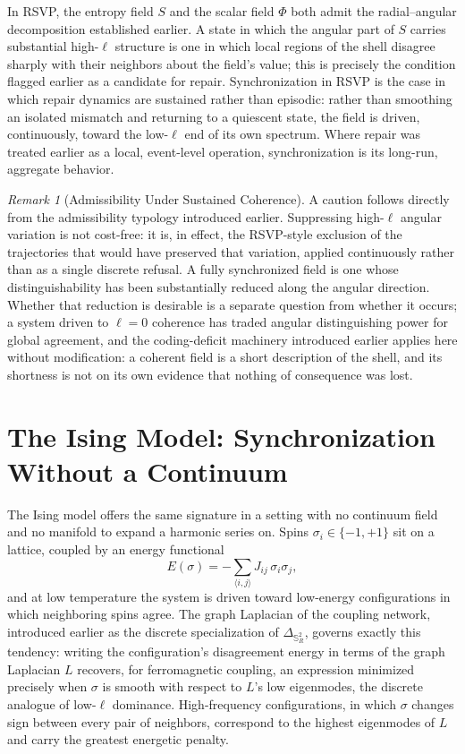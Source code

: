 \documentclass[11pt,fleqn]{book}
\numberwithin{equation}{chapter}
\theoremstyle{plain}
\theoremstyle{definition}
\theoremstyle{remark}
\newtheorem{remark}[theorem]{Remark}
\newcommand{\Sphere}{\mathbb{S}^{2}}
\begin{document}
In RSVP, the entropy field \(S\) and the scalar field \(\Phi\) both admit the radial--angular decomposition established earlier. A state in which the angular part of \(S\) carries substantial high-\(\ell\) structure is one in which local regions of the shell disagree sharply with their neighbors about the field's value; this is precisely the condition flagged earlier as a candidate for repair. Synchronization in RSVP is the case in which repair dynamics are sustained rather than episodic: rather than smoothing an isolated mismatch and returning to a quiescent state, the field is driven, continuously, toward the low-\(\ell\) end of its own spectrum. Where repair was treated earlier as a local, event-level operation, synchronization is its long-run, aggregate behavior.

\begin{remark}[Admissibility Under Sustained Coherence]
A caution follows directly from the admissibility typology introduced earlier. Suppressing high-\(\ell\) angular variation is not cost-free: it is, in effect, the RSVP-style exclusion of the trajectories that would have preserved that variation, applied continuously rather than as a single discrete refusal. A fully synchronized field is one whose distinguishability has been substantially reduced along the angular direction. Whether that reduction is desirable is a separate question from whether it occurs; a system driven to \(\ell=0\) coherence has traded angular distinguishing power for global agreement, and the coding-deficit machinery introduced earlier applies here without modification: a coherent field is a short description of the shell, and its shortness is not on its own evidence that nothing of consequence was lost.
\end{remark}

\section{The Ising Model: Synchronization Without a Continuum}

The Ising model offers the same signature in a setting with no continuum field and no manifold to expand a harmonic series on. Spins \(\sigma_i \in \{-1,+1\}\) sit on a lattice, coupled by an energy functional
\begin{equation}
E(\sigma) = -\sum_{\langle i,j\rangle} J_{ij}\,\sigma_i \sigma_j,
\end{equation}
and at low temperature the system is driven toward low-energy configurations in which neighboring spins agree. The graph Laplacian of the coupling network, introduced earlier as the discrete specialization of \(\Delta_{\Sphere_R}\), governs exactly this tendency: writing the configuration's disagreement energy in terms of the graph Laplacian \(L\) recovers, for ferromagnetic coupling, an expression minimized precisely when \(\sigma\) is smooth with respect to \(L\)'s low eigenmodes, the discrete analogue of low-\(\ell\) dominance. High-frequency configurations, in which \(\sigma\) changes sign between every pair of neighbors, correspond to the highest eigenmodes of \(L\) and carry the greatest energetic penalty.
\end{document}
